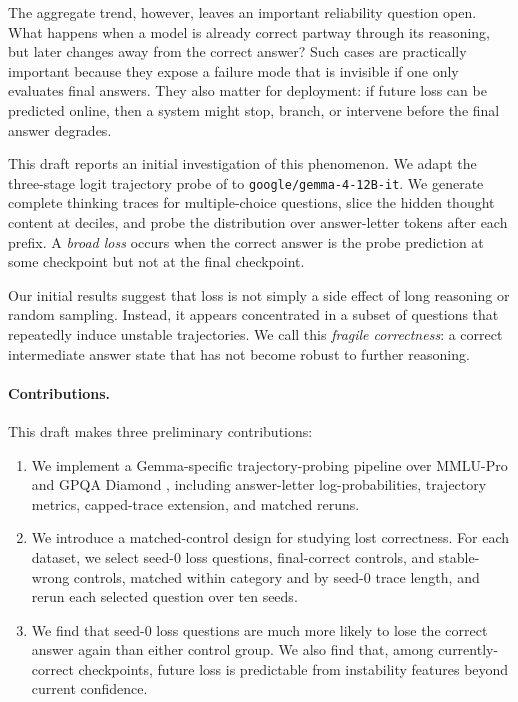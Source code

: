\documentclass[11pt]{article}
\begin{document}
The aggregate trend, however, leaves an important reliability question open.
What happens when a model is already correct partway through its reasoning,
but later changes away from the correct answer? Such cases are practically
important because they expose a failure mode that is invisible if one only
evaluates final answers. They also matter for deployment: if future loss can
be predicted online, then a system might stop, branch, or intervene before
the final answer degrades.

This draft reports an initial investigation of this phenomenon. We adapt the
three-stage logit trajectory probe of \citet{ballon2026probing} to
\texttt{google/gemma-4-12B-it}. We generate complete thinking traces for
multiple-choice questions, slice the hidden thought content at deciles, and
probe the distribution over answer-letter tokens after each prefix. A
\emph{broad loss} occurs when the correct answer is the probe prediction at
some checkpoint but not at the final checkpoint.

Our initial results suggest that loss is not simply a side effect of long
reasoning or random sampling. Instead, it appears concentrated in a subset of
questions that repeatedly induce unstable trajectories. We call this
\emph{fragile correctness}: a correct intermediate answer state that has not
become robust to further reasoning.

\paragraph{Contributions.}
This draft makes three preliminary contributions:

\begin{enumerate}[leftmargin=*]
  \item We implement a Gemma-specific trajectory-probing pipeline over
  MMLU-Pro \citep{wang2024mmlupro} and GPQA Diamond \citep{rein2023gpqa},
  including answer-letter log-probabilities, trajectory metrics, capped-trace
  extension, and matched reruns.

  \item We introduce a matched-control design for studying lost correctness.
  For each dataset, we select seed-0 loss questions, final-correct controls,
  and stable-wrong controls, matched within category and by seed-0 trace
  length, and rerun each selected question over ten seeds.

  \item We find that seed-0 loss questions are much more likely to lose the
  correct answer again than either control group. We also find that, among
  currently-correct checkpoints, future loss is predictable from instability
  features beyond current confidence.
\end{enumerate}
\end{document}
